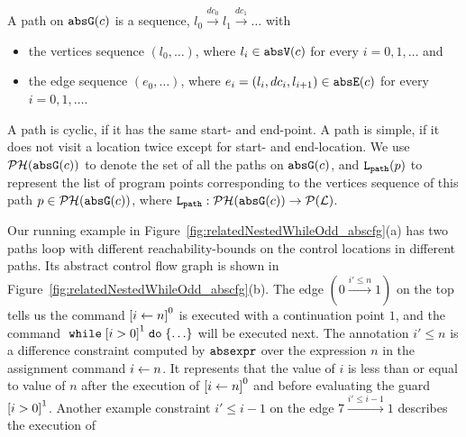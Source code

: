 \begin{defn}
  \label{def:abs_cfgpath} 
  A path on $\mathtt{abs}{\mathtt{G}}(c)$ is a sequence, $ l_0 \xrightarrow{dc_0} l_1 \xrightarrow{dc_1} \ldots $ with
  \begin{itemize}
  \item the vertices sequence $(l_0, \ldots)$, where $l_i \in \mathtt{abs}{\mathtt{V}}(c)$ for every $i = 0, 1, \ldots$ and
  \item the edge sequence $(e_0, \ldots)$, where $e_i = (l_{i}, dc_i, l_{i + 1}) \in \mathtt{abs}{\mathtt{E}}(c)$ for every $i = 0, 1, \ldots$.
  \end{itemize}
  A path is cyclic, if it has the same start- and end-point. A path is simple, if it does not visit a location twice except for start- and end-location. We use $\mathcal{PH}(\mathtt{abs}{\mathtt{G}}(c))$ to denote the set of all the paths on $\mathtt{abs}{\mathtt{G}}(c)$,
  and $\mathtt{L}_{\mathtt{path}}(p)$ to represent the list of program points corresponding to the vertices sequence of this path $p \in \mathcal{PH}(\mathtt{abs}{\mathtt{G}}(c))$,
  where $\mathtt{L}_{\mathtt{path}} : \mathcal{PH}(\mathtt{abs}{\mathtt{G}}(c)) \to \mathcal{P}{(\mathcal{L})}$.
  \end{defn}
% 
Our running example in Figure~\ref{fig:relatedNestedWhileOdd_abscfg}(a) has two paths loop with different reachability-bounds on the control
locations in different paths.
Its abstract control flow graph is shown in Figure~\ref{fig:relatedNestedWhileOdd_abscfg}(b).
The edge $(0 \xrightarrow{i' \leq n} 1)$ on the top tells us the command 
$\clabel{\assign{i}{n}}^0$ is executed with a continuation point $1$, and the
command $\ewhile \clabel{i > 0}^1 \edo \{\ldots\}$ will be executed next.
The annotation $i' \leq n$ is a difference constraint 
computed by $\mathtt{abs}{\mathtt{expr}}$ over
the expression $n$ in the assignment command $\mathrel{ i \leftarrow n }$.
It represents that the value of $i$ is less than or equal to value of $n$ after the
execution of $\clabel{\assign{i}{n}}^0$ and before evaluating the guard $\clabel{i > 0}^1$.
Another example constraint $i' \leq i - 1$ on the edge $7 \xrightarrow{i' \leq i - 1} 1$
describes the execution of
